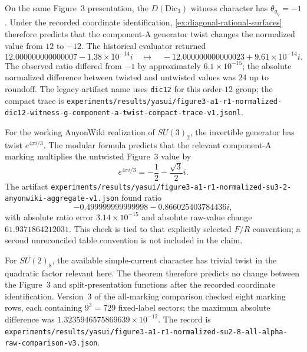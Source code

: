 \begin{example}
\label{ex:dic3-yasui-a1}
On the same Figure~3 presentation, the $D(\mathrm{Dic}_3)$ witness character
has $\theta_{g_\eta}=-1$.  Under the recorded coordinate identification,
\cref{ex:diagonal-rational-surfaces} therefore predicts that the component-A
generator twist changes the normalized value from $12$ to $-12$.  The
historical evaluator returned
\[
  12.000000000000007-1.38\times10^{-14}i
  \quad\longmapsto\quad
  -12.000000000000023+9.61\times10^{-14}i.
\]
The observed ratio differed from $-1$ by approximately $6.1\times10^{-15}$;
the absolute normalized difference between twisted and untwisted values was
$24$ up to roundoff.  The legacy artifact name uses \texttt{dic12} for this
order-$12$ group; the compact trace is
\nolinkurl{experiments/results/yasui/figure3-a1-r1-normalized-dic12-witness-g-component-a-twist-compact-trace-v1.jsonl}.
\end{example}

\begin{example}
\label{ex:su3-2-yasui-a1}
For the working AnyonWiki realization of $SU(3)_2$, the invertible generator
has twist $e^{4\pi i/3}$.  The modular formula predicts that the relevant
component-A marking multiplies the untwisted Figure~3 value by
\[
 e^{4\pi i/3}=-\frac12-\frac{\sqrt3}{2}i.
\]
The artifact
\nolinkurl{experiments/results/yasui/figure3-a1-r1-normalized-su3-2-anyonwiki-aggregate-v1.json}
found ratio
\[
 -0.499999999999998-0.866025403784436i,
\]
with absolute ratio error $3.14\times10^{-15}$ and absolute raw-value change
$61.9371864212031$.
This check is tied to that explicitly selected $F/R$ convention; a second
unreconciled table convention is not included in the claim.
\end{example}

\begin{example}
\label{ex:su2-8-yasui-a1}
For $SU(2)_8$, the available simple-current character has trivial twist in
the quadratic factor relevant here.  The theorem therefore predicts no
change between the Figure~3 and split-presentation functions after the
recorded coordinate identification.  Version~3 of the all-marking comparison
checked eight marking rows, each containing $9^3=729$ fixed-label sectors;
the maximum absolute difference was
$1.3235946575869639\times10^{-12}$.  The record is
\nolinkurl{experiments/results/yasui/figure3-a1-r1-normalized-su2-8-all-alpha-raw-comparison-v3.json}.
\end{example}

